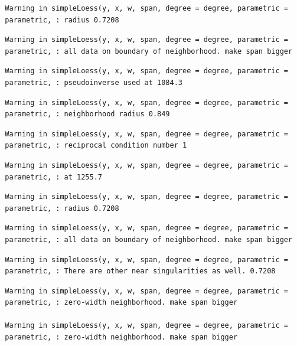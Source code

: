 \documentclass[12pt,twoside]{reedthesis}
\begin{document}
  \begin{verbatim}
  Warning in simpleLoess(y, x, w, span, degree = degree, parametric =
  parametric, : radius 0.7208
  \end{verbatim}
  
  \begin{verbatim}
  Warning in simpleLoess(y, x, w, span, degree = degree, parametric =
  parametric, : all data on boundary of neighborhood. make span bigger
  \end{verbatim}
  
  \begin{verbatim}
  Warning in simpleLoess(y, x, w, span, degree = degree, parametric =
  parametric, : pseudoinverse used at 1084.3
  \end{verbatim}
  
  \begin{verbatim}
  Warning in simpleLoess(y, x, w, span, degree = degree, parametric =
  parametric, : neighborhood radius 0.849
  \end{verbatim}
  
  \begin{verbatim}
  Warning in simpleLoess(y, x, w, span, degree = degree, parametric =
  parametric, : reciprocal condition number 1
  \end{verbatim}
  
  \begin{verbatim}
  Warning in simpleLoess(y, x, w, span, degree = degree, parametric =
  parametric, : at 1255.7
  \end{verbatim}
  
  \begin{verbatim}
  Warning in simpleLoess(y, x, w, span, degree = degree, parametric =
  parametric, : radius 0.7208
  \end{verbatim}
  
  \begin{verbatim}
  Warning in simpleLoess(y, x, w, span, degree = degree, parametric =
  parametric, : all data on boundary of neighborhood. make span bigger
  \end{verbatim}
  
  \begin{verbatim}
  Warning in simpleLoess(y, x, w, span, degree = degree, parametric =
  parametric, : There are other near singularities as well. 0.7208
  \end{verbatim}
  
  \begin{verbatim}
  Warning in simpleLoess(y, x, w, span, degree = degree, parametric =
  parametric, : zero-width neighborhood. make span bigger
  
  Warning in simpleLoess(y, x, w, span, degree = degree, parametric =
  parametric, : zero-width neighborhood. make span bigger
  \end{verbatim}
  
\end{document}
